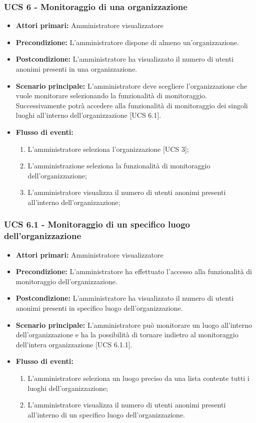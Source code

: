 

\subsubsection{UCS 6 - Monitoraggio di una organizzazione}
\begin{itemize}
	\item \textbf{Attori primari:} Amministratore visualizzatore
	\item \textbf{Precondizione:} L'amministratore dispone di almeno un'organizzazione.
	\item \textbf{Postcondizione:} L'amministratore ha visualizzato il numero di utenti anonimi presenti in una organizzazione.
	\item \textbf{Scenario principale:} L'amministratore deve scegliere l'organizzazione che vuole monitorare selezionando la funzionalità di monitoraggio. Successivamente potrà accedere alla funzionalità di monitoraggio dei singoli luoghi all'interno dell'organizzazione [UCS 6.1].
	\item \textbf{Flusso di eventi:}
\begin{enumerate}
	\item L'amministratore seleziona l'organizzazione [UCS 3]; 
	\item L'amministrazione seleziona la funzionalità di monitoraggio dell'organizzazione;
	\item L'amministratore visualizza il numero di utenti anonimi presenti all'interno dell'organizzazione;
\end{enumerate}
\end{itemize}

\subsubsection{UCS 6.1 - Monitoraggio di un specifico luogo dell'organizzazione}
\begin{itemize}
	\item \textbf{Attori primari:} Amministratore visualizzatore
	\item \textbf{Precondizione:} L'amministratore ha effettuato l'accesso alla funzionalità di monitoraggio dell'organizzazione.
	\item \textbf{Postcondizione:} L'amministratore ha visualizzato il numero di utenti anonimi presenti in specifico luogo dell'organizzazione.
	\item \textbf{Scenario principale:} L'amministratore può monitorare un luogo all'interno dell'organizzazione e ha la possibilità di tornare indietro al monitoraggio dell'intera organizzazione [UCS 6.1.1].
	\item \textbf{Flusso di eventi:}
	\begin{enumerate}
	\item L'amministratore seleziona un luogo preciso da una lista contente tutti i luoghi dell'organizzazione;
	\item L'amministratore visualizza il numero di utenti anonimi presenti all'interno di un specifico luogo dell'organizzazione.
	\end{enumerate}
\end{itemize}

